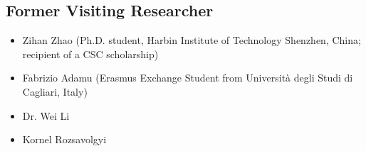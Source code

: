 \subsection*{Former Visiting Researcher}

\begin{itemize}[leftmargin=*]
    \item Zihan Zhao (Ph.D. student, Harbin Institute of Technology Shenzhen, China; recipient of a CSC scholarship)
    \item Fabrizio Adamu (Erasmus Exchange Student from Università degli Studi di Cagliari, Italy)
    \item Dr. Wei Li
    \item Kornel Rozsavolgyi 
\end{itemize}